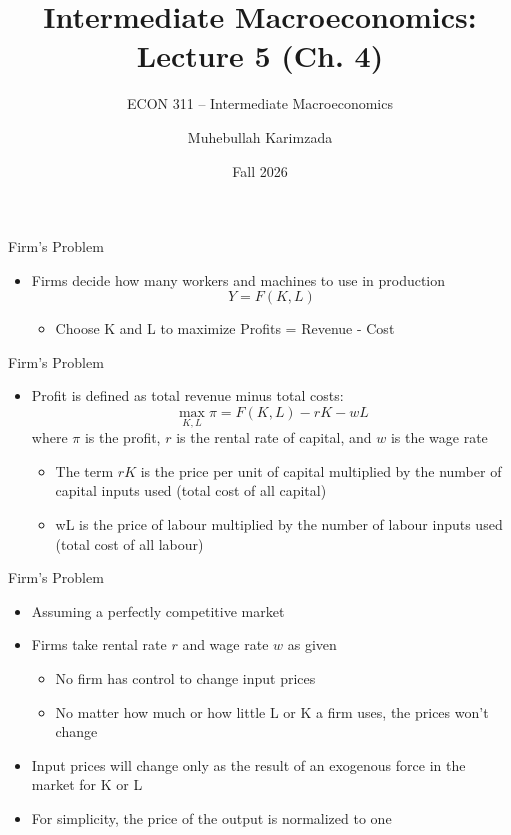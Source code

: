 \documentclass[aspectratio=1610]{beamer}
\title[Fall - Lecture 5] %
{Intermediate Macroeconomics: Lecture  5 (Ch. 4)}
\subtitle{ECON 311 -- Intermediate Macroeconomics}
\author{Muhebullah Karimzada}
\institute{School of Economics \\\ University of Northern British Columbia}
\date{Fall 2026}
\begin{document}
\begin{frame}[plain]
  \titlepage
\end{frame}

\begin{frame}[wide]{Firm's Problem}
	\begin{itemize}
		\item 	Firms decide how many workers and machines to use in production
		\[Y = F(K,L)\]
		\begin{itemize}
			\item  Choose K and L to maximize Profits = Revenue - Cost
		\end{itemize}
	\end{itemize}
\end{frame}

\begin{frame}[wide]{Firm's Problem}
	\begin{itemize}
		\item Profit is defined as total revenue minus total costs:
		\[\max_{K,L} \pi = F(K,L) - rK - wL\]
		where $\pi$ is the profit, $r$ is the rental rate of capital, and $w$ is the wage rate
		
		\begin{itemize}
			\item The term 	$rK$ is the price per unit of capital multiplied by the number of capital inputs used (total cost of all capital)
			\item wL is the price of labour multiplied by the number of labour inputs used (total cost of all labour)
		\end{itemize}
	\end{itemize}
\end{frame}

\begin{frame}[wide]{Firm's Problem}
	\begin{itemize}
		\item Assuming a perfectly competitive market
		\item Firms take rental rate $r$ and wage rate $w$ as given
		\vspace{2mm}
		\begin{itemize}
			\item No firm has control to change input prices
			\item No matter how much or how little L or K a firm uses, the prices won’t change
		\end{itemize}
		\item Input prices will change only as the result of an exogenous force in the market for K or L
		\item  For simplicity, the price of the output is normalized to one
	\end{itemize}
\end{frame}
\end{document}
